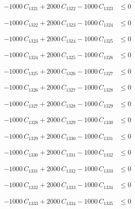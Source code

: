\documentclass[a4paper,11pt]{article}
\begin{document}
\begin{align}
-1000\,C_{1321} + 2000\,C_{1322} - 1000\,C_{1323} &\leq 0 \nonumber
\end{align}

\begin{align}
-1000\,C_{1322} + 2000\,C_{1323} - 1000\,C_{1324} &\leq 0 \nonumber
\end{align}

\begin{align}
-1000\,C_{1323} + 2000\,C_{1324} - 1000\,C_{1325} &\leq 0 \nonumber
\end{align}

\begin{align}
-1000\,C_{1324} + 2000\,C_{1325} - 1000\,C_{1326} &\leq 0 \nonumber
\end{align}

\begin{align}
-1000\,C_{1325} + 2000\,C_{1326} - 1000\,C_{1327} &\leq 0 \nonumber
\end{align}

\begin{align}
-1000\,C_{1326} + 2000\,C_{1327} - 1000\,C_{1328} &\leq 0 \nonumber
\end{align}

\begin{align}
-1000\,C_{1327} + 2000\,C_{1328} - 1000\,C_{1329} &\leq 0 \nonumber
\end{align}

\begin{align}
-1000\,C_{1328} + 2000\,C_{1329} - 1000\,C_{1330} &\leq 0 \nonumber
\end{align}

\begin{align}
-1000\,C_{1329} + 2000\,C_{1330} - 1000\,C_{1331} &\leq 0 \nonumber
\end{align}

\begin{align}
-1000\,C_{1330} + 2000\,C_{1331} - 1000\,C_{1332} &\leq 0 \nonumber
\end{align}

\begin{align}
-1000\,C_{1331} + 2000\,C_{1332} - 1000\,C_{1333} &\leq 0 \nonumber
\end{align}

\begin{align}
-1000\,C_{1332} + 2000\,C_{1333} - 1000\,C_{1334} &\leq 0 \nonumber
\end{align}

\begin{align}
-1000\,C_{1333} + 2000\,C_{1334} - 1000\,C_{1335} &\leq 0 \nonumber
\end{align}
\end{document}
